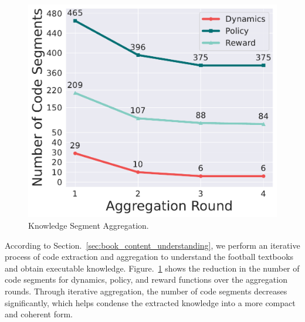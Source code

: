 \begin{figure}
\vspace{-1.7cm}
    \begin{center}
        \includegraphics[width=0.85\linewidth]{fig/code_segment_reduction_aggregation.pdf}
        \caption{Knowledge Segment Aggregation.}
        \label{fig:code_segment}
    \end{center}
    \vspace{-3.6cm}
\end{figure}
According to Section.~\ref{sec:book_content_understanding}, we perform an iterative process of code extraction and aggregation to understand the football textbooks and obtain executable knowledge. Figure.~\ref{fig:code_segment} shows the reduction in the number of code segments for dynamics, policy, and reward functions over the aggregation rounds. Through iterative aggregation, the number of code segments decreases significantly, which helps condense the extracted knowledge into a more compact and coherent form. 





